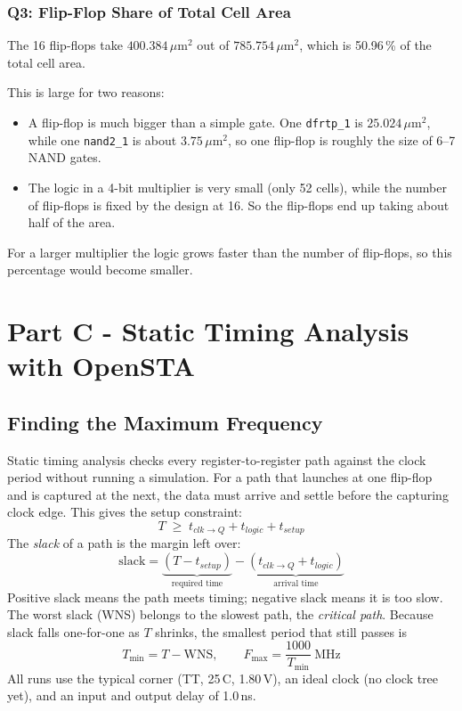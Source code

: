 \documentclass[11pt,a4paper]{article}
\begin{document}
\subsubsection{Q3: Flip-Flop Share of Total Cell Area}

The 16 flip-flops take $400.384\,\mu$m$^2$ out of $785.754\,\mu$m$^2$, which
is 50.96\,\% of the total cell area.

This is large for two reasons:
\begin{itemize}
  \item A flip-flop is much bigger than a simple gate. One \texttt{dfrtp\_1}
        is $25.024\,\mu$m$^2$, while one \texttt{nand2\_1} is about
        $3.75\,\mu$m$^2$, so one flip-flop is roughly the size of 6--7 NAND
        gates.
  \item The logic in a 4-bit multiplier is very small (only 52 cells), while
        the number of flip-flops is fixed by the design at 16. So the
        flip-flops end up taking about half of the area.
\end{itemize}
For a larger multiplier the logic grows faster than the number of
flip-flops, so this percentage would become smaller.


\section{Part C - Static Timing Analysis with OpenSTA}

\subsection{Finding the Maximum Frequency}

Static timing analysis checks every register-to-register path against the
clock period without running a simulation. For a path that launches at one
flip-flop and is captured at the next, the data must arrive and settle before
the capturing clock edge. This gives the setup constraint:
\[
  T \;\geq\; t_{clk\to Q} + t_{logic} + t_{setup}
\]
The \emph{slack} of a path is the margin left over:
\[
  \text{slack} = \underbrace{(T - t_{setup})}_{\text{required time}}
               - \underbrace{(t_{clk\to Q} + t_{logic})}_{\text{arrival time}}
\]
Positive slack means the path meets timing; negative slack means it is too
slow. The worst slack (WNS) belongs to the slowest path, the
\emph{critical path}. Because slack falls one-for-one as $T$ shrinks, the
smallest period that still passes is
\[
  T_{\min} = T - \text{WNS}, \qquad F_{\max} = \frac{1000}{T_{\min}}\ \text{MHz}
\]
All runs use the typical corner (TT, 25\,\textdegree C, 1.80\,V), an ideal
clock (no clock tree yet), and an input and output delay of 1.0\,ns.
\end{document}
